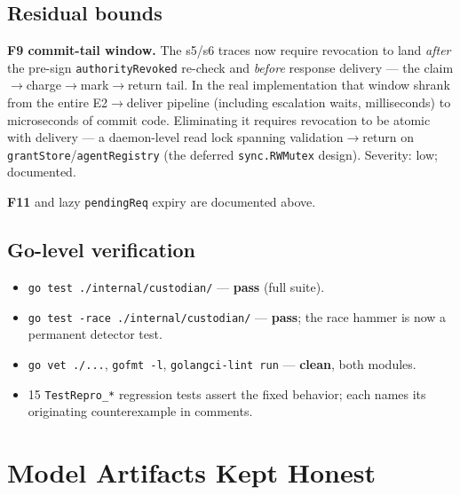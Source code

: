 \documentclass[11pt]{article}
\newcommand{\code}[1]{\texttt{#1}}
\begin{document}
\subsection{Residual bounds}
\label{sec:residuals}

\textbf{F9 commit-tail window.} The s5/s6 traces now require revocation to
land \emph{after} the pre-sign \code{authorityRevoked} re-check and \emph{before}
response delivery — the claim$\to$charge$\to$mark$\to$return tail. In the real
implementation that window shrank from the entire E2$\to$deliver pipeline
(including escalation waits, milliseconds) to microseconds of commit code.
Eliminating it requires revocation to be atomic with delivery — a daemon-level
read lock spanning validation$\to$return on \code{grantStore}/\code{agentRegistry}
(the deferred \code{sync.RWMutex} design). Severity: low; documented.

\textbf{F11} and lazy \code{pendingReq} expiry are documented above.

\subsection{Go-level verification}

\begin{itemize}[nosep]
  \item \code{go test ./internal/custodian/} — \textbf{pass} (full suite).
  \item \code{go test -race ./internal/custodian/} — \textbf{pass}; the race
        hammer is now a permanent detector test.
  \item \code{go vet ./...}, \code{gofmt -l}, \code{golangci-lint run} —
        \textbf{clean}, both modules.
  \item 15 \code{TestRepro\_*} regression tests assert the fixed behavior;
        each names its originating counterexample in comments.
\end{itemize}

\section{Model Artifacts Kept Honest}
\end{document}
